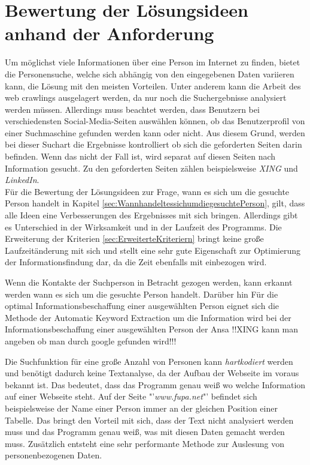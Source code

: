 

\chapter{Bewertung der Lösungsideen anhand der Anforderung}  %
\label{cha:AuswahlderLösunganhandAnforderungen} %
Um möglichst viele Informationen über eine Person im Internet zu finden, bietet die Personensuche, welche sich abhängig von den eingegebenen Daten variieren kann, die Lösung mit den meisten Vorteilen. Unter anderem kann die Arbeit des web crawlings ausgelagert werden, da nur noch die Suchergebnisse analysiert werden müssen. Allerdings muss beachtet werden, dass Benutzern bei verschiedensten Social-Media-Seiten auswählen können, ob das Benutzerprofil von einer Suchmaschine gefunden werden kann oder nicht. Aus diesem Grund, werden bei dieser Suchart die Ergebnisse kontrolliert ob sich die geforderten Seiten darin befinden. Wenn das nicht der Fall ist, wird separat auf diesen Seiten nach Information gesucht. Zu den geforderten Seiten zählen beispielsweise \textit{XING} und \textit{LinkedIn}.\\
Für die Bewertung der Lösungsideen zur Frage, wann es sich um die gesuchte Person handelt in Kapitel \ref{sec:WannhandeltessichumdiegesuchtePerson}, gilt, dass alle Ideen eine Verbesserungen des Ergebnisses mit sich bringen. Allerdings gibt es Unterschied in der Wirksamkeit und in der Laufzeit des Programms. Die Erweiterung der Kriterien \ref{sec:ErweiterteKriteriern} bringt keine große Laufzeitänderung mit sich und stellt eine sehr gute Eigenschaft zur Optimierung der Informationsfindung dar, da die Zeit ebenfalls mit einbezogen wird.

Wenn die Kontakte der Suchperson in Betracht gezogen werden, kann erkannt werden wann es sich um die gesuchte Person handelt. Darüber hin
Für die optimal Informationsbeschaffung einer ausgewählten Person eignet sich die Methode der Automatic Keyword Extraction um die Information wird bei der Informationsbeschaffung einer ausgewählten Person der Ansa
!!XING kann man angeben ob man durch google gefunden wird!!!

Die Suchfunktion für eine große Anzahl von Personen kann \textit{hartkodiert} werden und benötigt dadurch keine Textanalyse, da der Aufbau der Webseite im voraus bekannt ist. Das bedeutet, dass das Programm genau weiß wo welche Information auf einer Webseite steht. Auf der Seite "'\textit{www.fupa.net}"' befindet sich beispielsweise der Name einer Person immer an der gleichen Position einer Tabelle. Das bringt den Vorteil mit sich, dass der Text nicht analysiert werden muss und das Programm genau weiß, was mit diesen Daten gemacht werden muss. Zusätzlich entsteht eine sehr performante Methode zur Auslesung von personenbezogenen Daten.

